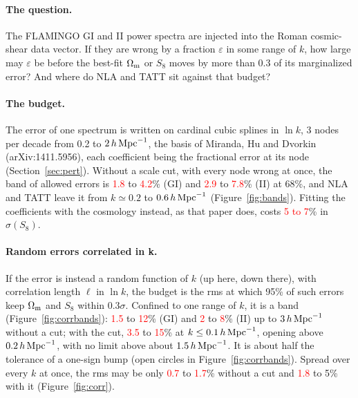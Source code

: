 \documentclass[11pt]{article}
\newcommand{\hMpc}{\,h\,{\rm Mpc}^{-1}}
\newcommand{\Om}{\Omega_{\rm m}}
\newif\ifnumbersfinal
\newcommand{\refresh}[1]{\ifnumbersfinal#1\else\textcolor{red}{#1}\fi}
\newcommand{\SplBandGILo}{\refresh{1.8}}
\newcommand{\SplBandGIHi}{\refresh{4.2}}
\newcommand{\SplBandIILo}{\refresh{2.9}}
\newcommand{\SplBandIIHi}{\refresh{7.8}}
\newcommand{\SplFreeSNoCut}{\refresh{5 to 7}}
\newcommand{\CorrNoCutGIMin}{\refresh{0.7}}
\newcommand{\CorrNoCutIIMax}{\refresh{1.7}}
\newcommand{\CorrCutMin}{\refresh{1.8}}
\newcommand{\BandNoCutGILo}{\refresh{1.5}}
\newcommand{\BandNoCutGIHi}{\refresh{12}}
\newcommand{\BandNoCutIILo}{\refresh{2}}
\newcommand{\BandNoCutIIHi}{\refresh{8}}
\newcommand{\BandCutLo}{\refresh{3.5}}
\newcommand{\BandCutHi}{\refresh{15}}
\newcommand{\Tol}{0.3}
\begin{document}
\paragraph{The question.}
The FLAMINGO GI and II power spectra are injected into the Roman cosmic-shear
data vector. If they are wrong by a fraction $\varepsilon$ in some range of
$k$, how large may $\varepsilon$ be before the best-fit $\Om$ or $S_8$ moves
by more than \Tol{} of its marginalized error? And where do NLA and TATT sit
against that budget?

\paragraph{The budget.}
The error of one spectrum is written on cardinal cubic splines in $\ln k$, 3
nodes per decade from 0.2 to $2\hMpc$, the basis of Miranda, Hu and Dvorkin
(arXiv:1411.5956), each coefficient being the fractional error at its node
(Section~\ref{sec:pert}). Without a scale cut, with every node wrong at once,
the band of allowed errors is \SplBandGILo{} to \SplBandGIHi\% (GI) and
\SplBandIILo{} to \SplBandIIHi\% (II) at 68\%, and NLA and TATT leave it from
$k \simeq 0.2$ to $0.6\hMpc$ (Figure~\ref{fig:bands}). Fitting the
coefficients with the cosmology instead, as that paper does, costs
\SplFreeSNoCut\% in $\sigma(S_8)$.

\paragraph{Random errors correlated in k.}
If the error is instead a random function of $k$ (up here, down there), with
correlation length $\ell$ in $\ln k$, the budget is the rms at which 95\% of
such errors keep $\Om$ and $S_8$ within \Tol$\sigma$. Confined to one
range of $k$, it is a band (Figure~\ref{fig:corrbands}): \BandNoCutGILo{} to
\BandNoCutGIHi\% (GI) and \BandNoCutIILo{} to \BandNoCutIIHi\% (II) up to
$3\hMpc$ without a cut; with the cut, \BandCutLo{} to \BandCutHi\% at $k \le
0.1\hMpc$, opening above $0.2\hMpc$, with no limit above about $1.5\hMpc$.
It is about half the tolerance of a one-sign bump (open circles in Figure~\ref{fig:corrbands}). Spread over every $k$ at once, the rms may be only
\CorrNoCutGIMin{} to \CorrNoCutIIMax\% without a cut and \CorrCutMin{} to
5\% with it (Figure~\ref{fig:corr}).
\end{document}
